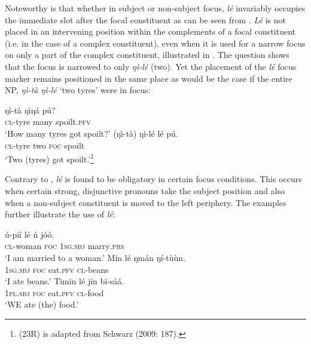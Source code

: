\documentclass[output=paper,colorlinks,citecolor=brown]{langscibook}
\begin{document}
Noteworthy is that whether in subject or non-subject focus, \textit{lé} invariably occupies the immediate slot after the focal constituent as can be seen from . \textit{Lé} is not placed in an intervening position within the complements of a focal constituent (i.e. in the case of a complex constituent), even when it is used for a narrow focus on only a part of the complex constituent, illustrated in . The question  shows that the focus is narrowed to only \textit{ŋì-lé} (two). Yet the placement of the \textit{lé} focus marker  remains positioned in the same place as would be the case if the entire NP,\textit{ ŋì-tà  ŋì-lé }‘two tyres’ were in focus:

\ea%
    \label{ex:bisilki:23}
    \ea\label{ex:bisilki:23a}
    \gll    ŋì-tà		ŋìŋá		pú?\\
            \textsc{cl-}tyre	many		spoilt\textsc{.pfv}\\
    \glt    ‘How many tyres got spoilt?’
    \ex\label{ex:bisilki:23b}
    \gll    (ŋì-tà)		ŋì-lé	lé	pú.\\
            \textsc{cl-}tyre	two	\textsc{foc}	spoilt\\
    \glt    ‘Two (tyres)  got spoilt.’\footnote{(23R) is adapted from Schwarz (2009: 187).}
    \z
\z

Contrary to \citet{Schwarz2009},\textit{ lé} is found to be obligatory in certain focus conditions. This occurs when certain strong, disjunctive pronouns take the subject position and also when a non-subject constituent is moved to the left periphery. The examples  further illustrate the use of \textit{lé}:

\ea%
    \label{ex:bisilki:24}
    \ea\label{ex:bisilki:24a}
    \gll    ú-píí		lé	ń		jóó.\\
            \textsc{cl-}woman	\textsc{foc}	\textsc{1sg.sbj}	marry\textsc{.prs}\\
    \glt    ‘I am married to a woman.’
    \ex\label{ex:bisilki:24b}
    \gll    Min	lé	ŋmán	ŋí-tùùn.\\
            \textsc{1sg.sbj}	\textsc{foc}	eat\textsc{.pfv}	\textsc{cl-}beans\\
    \glt    ‘I ate beans.’
    \ex\label{ex:bisilki:24c}
    \gll    Tìmīn		lé	jín		bī-sáá.\\
            \textsc{1pl.sbj}	\textsc{foc}	eat\textsc{.pfv}	\textsc{cl-}food\\
    \glt    ‘WE ate (the) food.’
    \z
\z
\end{document}
